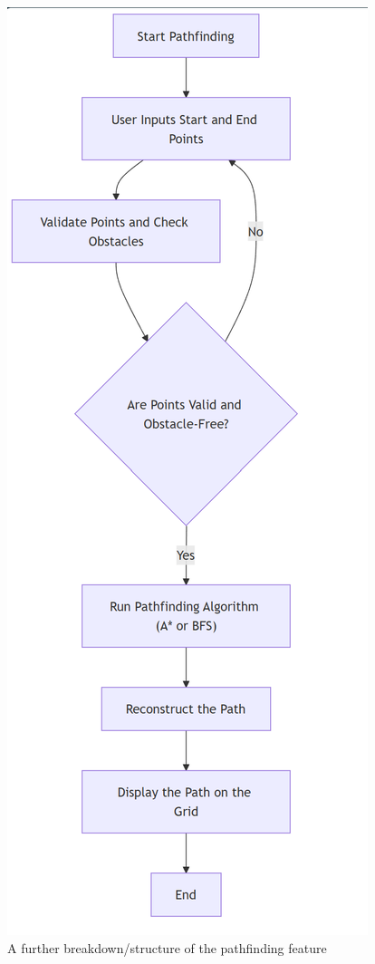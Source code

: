 \begin{figure}[!htbp]
	\centering
	\includegraphics[width=0.5\linewidth]{Images/pfoutline.png}
	\caption{A further breakdown/structure of the pathfinding feature}
\end{figure}


